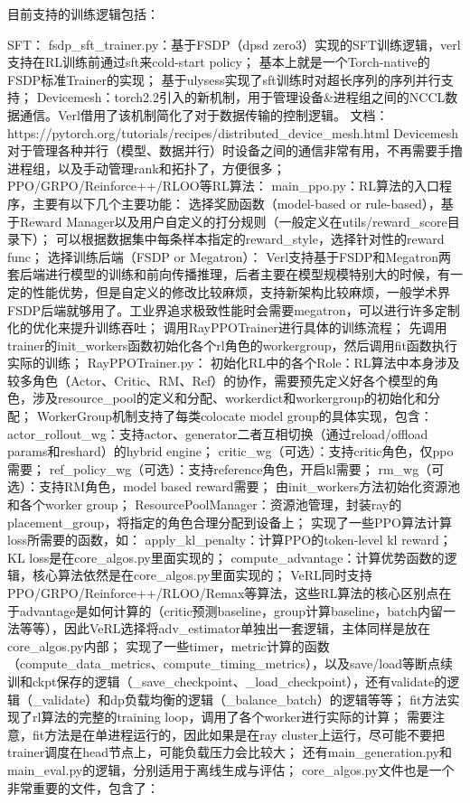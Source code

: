\documentclass{pkuthesis}
\begin{document}
目前支持的训练逻辑包括：

SFT：
fsdp_sft_trainer.py：基于FSDP（dpsd zero3）实现的SFT训练逻辑，verl支持在RL训练前通过sft来cold-start policy；
基本上就是一个Torch-native的FSDP标准Trainer的实现；
基于ulysess实现了sft训练时对超长序列的序列并行支持；
Devicemesh：torch2.2引入的新机制，用于管理设备&进程组之间的NCCL数据通信。Verl借用了该机制简化了对于数据传输的控制逻辑。
文档：https://pytorch.org/tutorials/recipes/distributed_device_mesh.html
Devicemesh对于管理各种并行（模型、数据并行）时设备之间的通信非常有用，不再需要手撸进程组，以及手动管理rank和拓扑了，方便很多；
PPO/GRPO/Reinforce++/RLOO等RL算法：
main_ppo.py：RL算法的入口程序，主要有以下几个主要功能：
选择奖励函数（model-based or rule-based），基于Reward Manager以及用户自定义的打分规则（一般定义在utils/reward_score目录下）；
可以根据数据集中每条样本指定的reward_style，选择针对性的reward func；
选择训练后端（FSDP or Megatron）：
Verl支持基于FSDP和Megatron两套后端进行模型的训练和前向传播推理，后者主要在模型规模特别大的时候，有一定的性能优势，但是自定义的修改比较麻烦，支持新架构比较麻烦，一般学术界FSDP后端就够用了。工业界追求极致性能时会需要megatron，可以进行许多定制化的优化来提升训练吞吐；
调用RayPPOTrainer进行具体的训练流程；
先调用trainer的init_workers函数初始化各个rl角色的workergroup，然后调用fit函数执行实际的训练；
RayPPOTrainer.py：
初始化RL中的各个Role：RL算法中本身涉及较多角色（Actor、Critic、RM、Ref）的协作，需要预先定义好各个模型的角色，涉及resource_pool的定义和分配、workerdict和workergroup的初始化和分配；
WorkerGroup机制支持了每类colocate model group的具体实现，包含：
actor_rollout_wg：支持actor、generator二者互相切换（通过reload/offload params和reshard）的hybrid engine；
critic_wg（可选）：支持critic角色，仅ppo需要；
ref_policy_wg（可选）：支持reference角色，开启kl需要；
rm_wg（可选）：支持RM角色，model based reward需要；
由init_workers方法初始化资源池和各个worker group；
ResourcePoolManager：资源池管理，封装ray的placement_group，将指定的角色合理分配到设备上；
实现了一些PPO算法计算loss所需要的函数，如：
apply_kl_penalty：计算PPO的token-level kl reward；
KL loss是在core_algos.py里面实现的；
compute_advantage：计算优势函数的逻辑，核心算法依然是在core_algos.py里面实现的；
VeRL同时支持PPO/GRPO/Reinforce++/RLOO/Remax等算法，这些RL算法的核心区别点在于advantage是如何计算的（critic预测baseline，group计算baseline，batch内留一法等等），因此VeRL选择将adv_estimator单独出一套逻辑，主体同样是放在core_algos.py内部；
实现了一些timer，metric计算的函数（compute_data_metrics、compute_timing_metrics），以及save/load等断点续训和ckpt保存的逻辑（_save_checkpoint、_load_checkpoint），还有validate的逻辑（_validate）和dp负载均衡的逻辑（_balance_batch）的逻辑等等；
fit方法实现了rl算法的完整的training loop，调用了各个worker进行实际的计算；
需要注意，fit方法是在单进程运行的，因此如果是在ray cluster上运行，尽可能不要把trainer调度在head节点上，可能负载压力会比较大；
还有main_generation.py和main_eval.py的逻辑，分别适用于离线生成与评估；
core_algos.py文件也是一个非常重要的文件，包含了：
\end{document}
